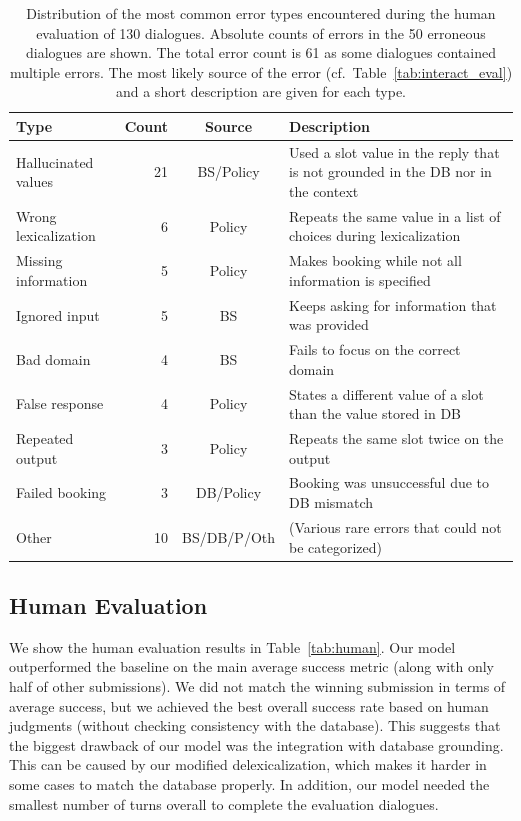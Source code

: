 \documentclass[11pt,a4paper]{article}
\begin{document}
\begin{table}[t]
\centering\small
\begin{tabularx}{\textwidth}{lrcX}
\toprule
Type & Count & Source & Description \\
\midrule
Hallucinated values & 21 & BS/Policy & Used a slot value in the reply that is not grounded in the DB nor in the context \\
Wrong lexicalization & 6 & Policy & Repeats the same value in a list of choices during lexicalization  \\
Missing information & 5 & Policy & Makes booking while not all information is specified \\
Ignored input  & 5& BS & Keeps asking for information that was provided \\
Bad domain     & 4 & BS  & Fails to focus on the correct domain \\
False response & 4 & Policy & States a different value of a slot than the value stored in DB \\
Repeated output& 3 & Policy & Repeats the same slot twice on the output \\
Failed booking & 3 & DB/Policy & Booking was unsuccessful due to DB mismatch\\
Other          &10 & BS/DB/P/Oth & (Various rare errors that could not be categorized) \\
\bottomrule
\end{tabularx}
\caption{Distribution of the most common error types encountered during the human evaluation of 130 dialogues. Absolute counts of errors in the 50 erroneous dialogues are shown. The total error count is 61 as some dialogues contained multiple errors. The most likely source of the error (cf.~Table~\ref{tab:interact_eval}) and a short description are given for each type.}
\label{tab:detailed_eval}
\end{table}

\subsection{Human Evaluation}

We show the human evaluation results in Table~\ref{tab:human}.
Our model outperformed the baseline on the main average success metric (along with only half of other submissions).
We did not match the winning submission in terms of average success, but we achieved the best overall success rate based on human judgments (without checking consistency with the database).
This suggests that the biggest drawback of our model was the integration with database grounding.
This can be caused by our modified delexicalization, which makes it harder in some cases to match the database properly.
In addition, our model 
needed the smallest number of turns overall to complete the evaluation dialogues.
\end{document}
